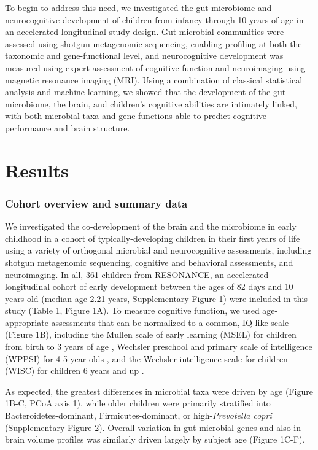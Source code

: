 \documentclass{article}
\begin{document}
To begin to address this need, we investigated the gut microbiome and
neurocognitive development of children from infancy through 10 years of
age in an accelerated longitudinal study design. Gut microbial
communities were assessed using shotgun metagenomic sequencing, enabling
profiling at both the taxonomic and gene-functional level, and
neurocognitive development was measured using expert-assessment of
cognitive function and neuroimaging using magnetic resonance imaging
(MRI). Using a combination of classical statistical analysis and machine
learning, we showed that the development of the gut microbiome, the
brain, and children's cognitive abilities are intimately linked, with
both microbial taxa and gene functions able to predict cognitive
performance and brain structure.

\section*{Results}

\subsubsection*{Cohort overview and summary data}

We investigated the co-development of the brain and the microbiome in
early childhood in a cohort of typically-developing children in their
first years of life using a variety of orthogonal microbial and
neurocognitive assessments, including shotgun metagenomic sequencing,
cognitive and behavioral assessments, and neuroimaging. In all, 361
children from RESONANCE,
an accelerated longitudinal cohort of early development
\cite{forrestAdvancingScienceChildren2018}
between the ages of 82 days and 10 years
old (median age 2.21 years, Supplementary Figure 1) were included in
this study (Table 1, Figure 1A). To measure cognitive function, we used
age-appropriate assessments that can be normalized to a common, IQ-like
scale (Figure 1B), including the Mullen scale of early learning (MSEL)
for children from birth to 3 years of age
\cite{mullenMullenScalesEarly1995},
Wechsler preschool and primary scale of intelligence (WPPSI)
for 4-5 year-olds
\cite{wechslerWechslerPreschoolPrimary2012},
and the Wechsler intelligence scale for children (WISC)
for children 6 years and up
\cite{wechslerWechslerIntelligenceScale1949}.

As expected, the greatest differences in microbial taxa were driven by
age (Figure 1B-C, PCoA axis 1), while older children were primarily
stratified into Bacteroidetes-dominant, Firmicutes-dominant, or
high-\emph{Prevotella copri} (Supplementary Figure 2). Overall variation
in gut microbial genes and also in brain volume profiles was similarly
driven largely by subject age (Figure 1C-F).
\end{document}
